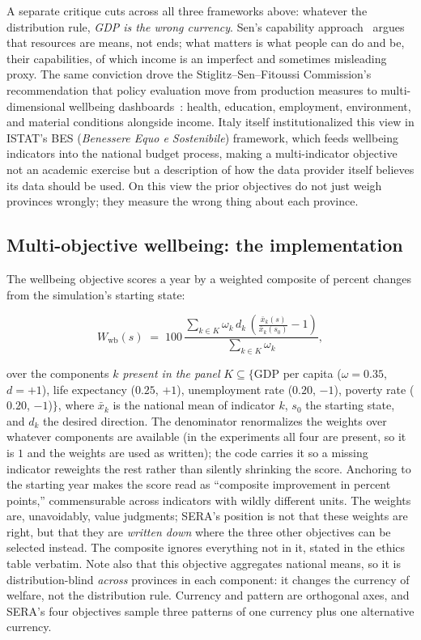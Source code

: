 \documentclass[11pt,a4paper]{article}
\begin{document}
A separate critique cuts across all three frameworks above: whatever the
distribution rule, \emph{GDP is the wrong currency}. Sen's capability
approach~\cite{sen1980} argues that resources are means, not ends; what matters
is what people can do and be, their capabilities, of which income is an
imperfect and sometimes misleading proxy. The same conviction drove the
Stiglitz--Sen--Fitoussi Commission's recommendation that policy evaluation move
from production measures to multi-dimensional wellbeing
dashboards~\cite{stiglitz2009}: health, education, employment, environment, and
material conditions alongside income. Italy itself institutionalized this view
in ISTAT's BES (\emph{Benessere Equo e Sostenibile}) framework, which feeds
wellbeing indicators into the national budget process, making a
multi-indicator objective not an academic exercise but a description of how
the data provider itself believes its data should be used. On this view the
prior objectives do not just weigh provinces wrongly; they measure the wrong
thing about each province.

\subsection{Multi-objective wellbeing: the implementation}

The wellbeing objective scores a year by a weighted composite of percent
changes from the simulation's starting state:

\begin{equation}
    W_{\text{wb}}(s) \;=\; 100 \, \frac{\sum_{k \in K} \omega_k \, d_k \,
    \left( \frac{\bar{x}_k(s)}{\bar{x}_k(s_0)} - 1 \right)}
    {\sum_{k \in K} \omega_k},
\end{equation}

over the components $k$ \emph{present in the panel} $K \subseteq \{$GDP per
capita ($\omega=0.35$, $d=+1$), life expectancy ($0.25$, $+1$), unemployment
rate ($0.20$, $-1$), poverty rate ($0.20$, $-1$)$\}$, where $\bar{x}_k$ is the
national mean of indicator $k$, $s_0$ the starting state, and $d_k$ the desired
direction. The denominator renormalizes the weights over whatever components
are available (in the experiments all four are present, so it is $1$ and the
weights are used as written); the code carries it so a missing indicator
reweights the rest rather than silently shrinking the score. Anchoring to the
starting year makes the score read as ``composite improvement in percent
points,'' commensurable across indicators with wildly different units. The
weights are, unavoidably, value judgments; SERA's position is not that these
weights are right, but that they are \emph{written down} where the three other
objectives can be selected instead. The composite ignores everything not in it,
stated in the ethics table verbatim. Note also that this objective
aggregates national means, so it is distribution-blind \emph{across} provinces
in each component: it changes the currency of welfare, not the distribution
rule. Currency and pattern are orthogonal axes, and SERA's four objectives
sample three patterns of one currency plus one alternative currency.
\end{document}
